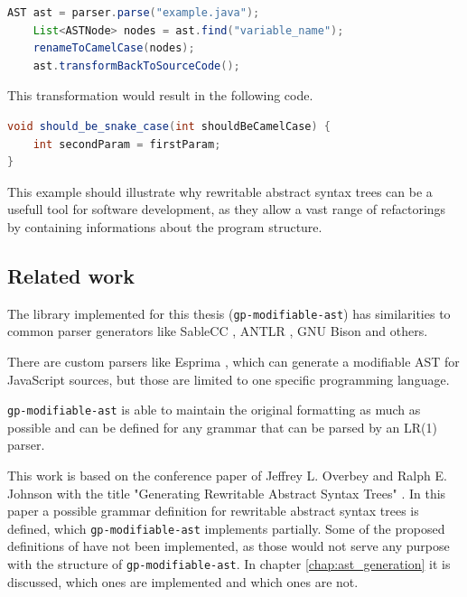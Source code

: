 \begin{lstlisting}[language=Java, caption=Example of transformation]
    AST ast = parser.parse("example.java");
    List<ASTNode> nodes = ast.find("variable_name");
    renameToCamelCase(nodes);
    ast.transformBackToSourceCode();
\end{lstlisting}

This transformation would result in the following code.

\begin{lstlisting}[language=Java, caption=Example of transformation]
void should_be_snake_case(int shouldBeCamelCase) {
    int secondParam = firstParam;
}
\end{lstlisting}

This example should illustrate why rewritable abstract syntax trees can be a usefull tool for software development, as they allow a vast range of refactorings by containing
informations about the program structure.

\subsection{Related work}

The library implemented for this thesis (\verb|gp-modifiable-ast|) has similarities to common parser generators like SableCC \cite{sablecc}, ANTLR \cite{antlr}, GNU Bison \cite{gnu-bison} and others.

There are custom parsers like Esprima \cite{esprima}, which can generate a modifiable AST for JavaScript sources, but those are limited to one specific programming
language.

\verb|gp-modifiable-ast| is able to maintain the original formatting as much as possible and can be defined for any grammar that can be parsed by an LR(1) parser.

This work is based on the conference paper of Jeffrey L. Overbey and Ralph E. Johnson with the title "Generating Rewritable Abstract Syntax Trees" \cite{GeneratingRewritableAST}.
In this paper a possible grammar definition for rewritable abstract syntax trees is defined, which \verb|gp-modifiable-ast| implements partially. 
Some of the proposed definitions of \cite{GeneratingRewritableAST} have not been implemented, as those would not serve any purpose with the
structure of \verb|gp-modifiable-ast|. In chapter \ref{chap:ast_generation} it is discussed, which ones are implemented and which ones are not.